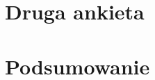 \documentclass{amuthesis}
\begin{document}

\hypertarget{sec-wyniki2}{%
\chapter{Druga ankieta}\label{sec-wyniki2}}


\hypertarget{podsumowanie}{%
\chapter{Podsumowanie}\label{podsumowanie}}

\printbibliography[heading=bibintoc, title=Bibliografia]
\end{document}
